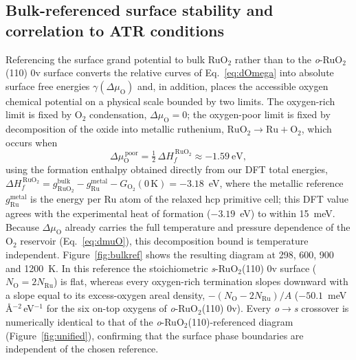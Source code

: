 \subsection*{Bulk-referenced surface stability and correlation to ATR conditions}
Referencing the surface grand potential to bulk RuO$_2$ rather than to the
\textit{o}-RuO$_2$(110) 0v surface converts the relative curves of
Eq.~\eqref{eq:dOmega} into absolute surface free energies
$\gamma(\Delta\mu_{\mathrm O})$ and, in addition, places the accessible oxygen
chemical potential on a physical scale bounded by two limits. The oxygen-rich
limit is fixed by O$_2$ condensation, $\Delta\mu_{\mathrm O}=0$; the oxygen-poor
limit is fixed by decomposition of the oxide into metallic ruthenium,
$\mathrm{RuO_2}\rightarrow\mathrm{Ru}+\mathrm{O_2}$, which occurs when
\begin{equation}
  \Delta\mu_{\mathrm O}^{\,\mathrm{poor}} =
  \tfrac{1}{2}\,\Delta H_f^{\,\mathrm{RuO_2}} \approx -1.59~\mathrm{eV},
  \label{eq:opoor}
\end{equation}
using the formation enthalpy obtained directly from our DFT total energies,
$\Delta H_f^{\,\mathrm{RuO_2}} = g^{\mathrm{bulk}}_{\mathrm{RuO_2}}
- g^{\mathrm{metal}}_{\mathrm{Ru}} - G_{\mathrm{O_2}}(0\,\mathrm{K}) = -3.18$~eV,
where the metallic reference $g^{\mathrm{metal}}_{\mathrm{Ru}}$ is the energy per
Ru atom of the relaxed hcp primitive cell; this DFT value agrees with the
experimental heat of formation ($-3.19$~eV) to within 15~meV. Because
$\Delta\mu_{\mathrm O}$
already carries the full temperature and pressure dependence of the O$_2$
reservoir (Eq.~\eqref{eq:dmuO}), this decomposition bound is temperature
independent. Figure~\ref{fig:bulkref} shows the resulting diagram at 298, 600,
900 and 1200~K. In this reference the stoichiometric \textit{s}-RuO$_2$(110) 0v
surface ($N_{\mathrm O}=2N_{\mathrm{Ru}}$) is flat, whereas every oxygen-rich
termination slopes downward with a slope equal to its excess-oxygen areal
density, $-(N_{\mathrm O}-2N_{\mathrm{Ru}})/A$
($-50.1$~meV\,\AA$^{-2}$\,eV$^{-1}$ for the six on-top oxygens of
\textit{o}-RuO$_2$(110) 0v). Every \textit{o}$\rightarrow$\textit{s} crossover is
numerically identical to that of the \textit{o}-RuO$_2$(110)-referenced diagram
(Figure~\ref{fig:unified}), confirming that the surface phase
boundaries are independent of the chosen reference.


